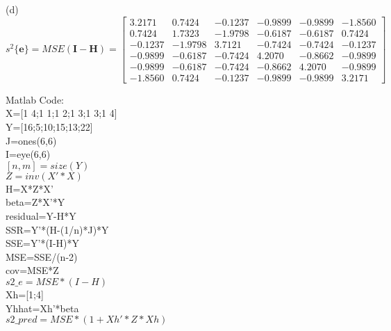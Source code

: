 \documentclass[12pt]{article}
\begin{document}
{(d) $s^2\{\textbf{e}\}=MSE(\textbf{I}-\textbf{H})=\begin{bmatrix}3.2171&0.7424& -0.1237& -0.9899& -0.9899&-1.8560\\ 0.7424&1.7323&-1.9798&-0.6187&-0.6187& 0.7424\\ -0.1237&-1.9798&3.7121&-0.7424&-0.7424& -0.1237\\ -0.9899&-0.6187&-0.7424&4.2070&-0.8662&-0.9899\\-0.9899&-0.6187&-0.7424&-0.8662&4.2070&-0.9899\\
-1.8560&0.7424 &-0.1237&-0.9899&-0.9899&3.2171\end{bmatrix}$

Matlab Code:\\
X=[1 4;1 1;1 2;1 3;1 3;1 4]\\
Y=[16;5;10;15;13;22]\\
J=ones(6,6)\\
I=eye(6,6)\\
$[n,m]=size(Y)$\\
$Z=inv(X'*X)$\\
H=X*Z*X'\\
beta=Z*X'*Y\\
residual=Y-H*Y\\
SSR=Y'*(H-(1/n)*J)*Y\\
SSE=Y'*(I-H)*Y\\
MSE=SSE/(n-2)\\
cov=MSE*Z\\
$s2\_e=MSE*(I-H)$\\
Xh=[1;4]\\
Yhhat=Xh'*beta\\
$s2\_pred=MSE*(1+Xh'*Z*Xh)$\\
}
\end{document}
